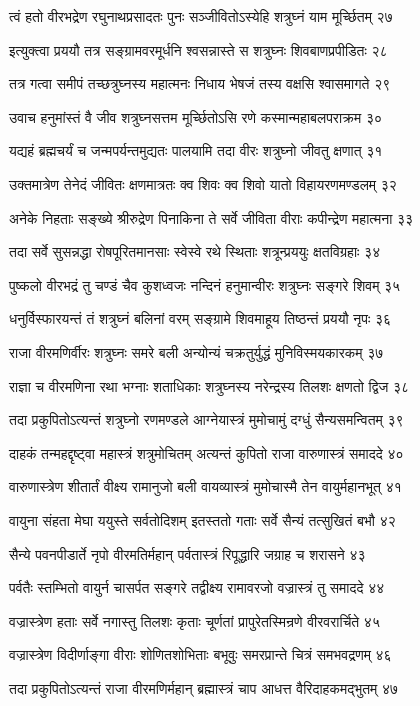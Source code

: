त्वं हतो वीरभद्रेण रघुनाथप्रसादतः
पुनः सञ्जीवितोऽस्येहि शत्रुघ्नं याम मूर्च्छितम् २७

इत्युक्त्वा प्रययौ तत्र सङ्ग्रामवरमूर्धनि
श्वसन्नास्ते स शत्रुघ्नः शिवबाणप्रपीडितः २८

तत्र गत्वा समीपं तच्छत्रुघ्नस्य महात्मनः
निधाय भेषजं तस्य वक्षसि श्वासमागते २९

उवाच हनुमांस्तं वै जीव शत्रुघ्नसत्तम
मूर्च्छितोऽसि रणे कस्मान्महाबलपराक्रम ३०

यद्यहं ब्रह्मचर्यं च जन्मपर्यन्तमुद्यतः
पालयामि तदा वीरः शत्रुघ्नो जीवतु क्षणात् ३१

उक्तमात्रेण तेनेदं जीवितः क्षणमात्रतः
क्व शिवः क्व शिवो यातो विहायरणमण्डलम् ३२

अनेके निहताः सङ्ख्ये श्रीरुद्रेण पिनाकिना
ते सर्वे जीविता वीराः कपीन्द्रेण महात्मना ३३

तदा सर्वे सुसन्नद्धा रोषपूरितमानसाः
स्वेस्वे रथे स्थिताः शत्रून्प्रययुः क्षतविग्रहाः ३४

पुष्कलो वीरभद्रं तु चण्डं चैव कुशध्वजः
नन्दिनं हनुमान्वीरः शत्रुघ्नः सङ्गरे शिवम् ३५

धनुर्विस्फारयन्तं तं शत्रुघ्नं बलिनां वरम्
सङ्ग्रामे शिवमाहूय तिष्ठन्तं प्रययौ नृपः ३६

राजा वीरमणिर्वीरः शत्रुघ्नः समरे बली
अन्योन्यं चक्रतुर्युद्धं मुनिविस्मयकारकम् ३७

राज्ञा च वीरमणिना रथा भग्नाः शताधिकाः
शत्रुघ्नस्य नरेन्द्रस्य तिलशः क्षणतो द्विज ३८

तदा प्रकुपितोऽत्यन्तं शत्रुघ्नो रणमण्डले
आग्नेयास्त्रं मुमोचामुं दग्धुं सैन्यसमन्वितम् ३९

दाहकं तन्महद्दृष्ट्वा महास्त्रं शत्रुमोचितम्
अत्यन्तं कुपितो राजा वारुणास्त्रं समाददे ४०

वारुणास्त्रेण शीतार्तं वीक्ष्य रामानुजो बली
वायव्यास्त्रं मुमोचास्मै तेन वायुर्महानभूत् ४१

वायुना संहता मेघा ययुस्ते सर्वतोदिशम्
इतस्ततो गताः सर्वे सैन्यं तत्सुखितं बभौ ४२

सैन्ये पवनपीडार्ते नृपो वीरमतिर्महान्
पर्वतास्त्रं रिपूद्धारि जग्राह च शरासने ४३

पर्वतैः स्तम्भितो वायुर्न चासर्पत सङ्गरे
तद्वीक्ष्य रामावरजो वज्रास्त्रं तु समाददे ४४

वज्रास्त्रेण हताः सर्वे नगास्तु तिलशः कृताः
चूर्णतां प्रापुरेतस्मिन्रणे वीरवरार्चिते ४५

वज्रास्त्रेण विदीर्णाङ्गा वीराः शोणितशोभिताः
बभूवुः समरप्रान्ते चित्रं समभवद्रणम् ४६

तदा प्रकुपितोऽत्यन्तं राजा वीरमणिर्महान्
ब्रह्मास्त्रं चाप आधत्त वैरिदाहकमद्भुतम् ४७

